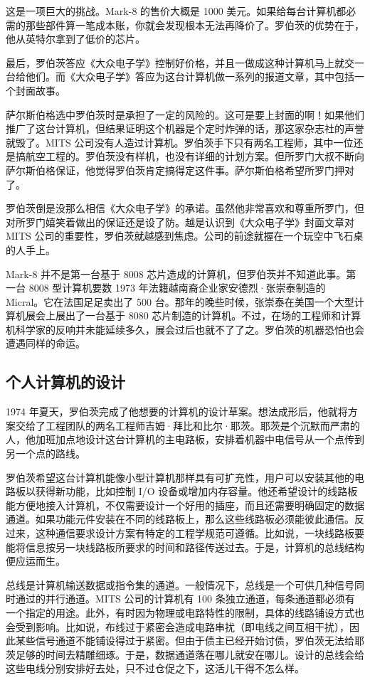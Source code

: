 \documentclass[12pt,UTF8]{ctexbook}
\begin{document}
这是一项巨大的挑战。Mark-8 的售价大概是 1000 美元。如果给每台计算机都必需的那些部件算一笔成本账，你就会发现根本无法再降价了。罗伯茨的优势在于，他从英特尔拿到了低价的芯片。

最后，罗伯茨答应《大众电子学》控制好价格，并且一做成这种计算机马上就交一台给他们。而《大众电子学》答应为这台计算机做一系列的报道文章，其中包括一个封面故事。

萨尔斯伯格选中罗伯茨时是承担了一定的风险的。这可是要上封面的啊！如果他们推广了这台计算机，但结果证明这个机器是个定时炸弹的话，那这家杂志社的声誉就毁了。MITS 公司没有人造过计算机。罗伯茨手下只有两名工程师，其中一位还是搞航空工程的。罗伯茨没有样机，也没有详细的计划方案。但所罗门大叔不断向萨尔斯伯格保证，他觉得罗伯茨肯定搞得定这件事。萨尔斯伯格希望所罗门押对了。

罗伯茨倒是没那么相信《大众电子学》的承诺。虽然他非常喜欢和尊重所罗门，但对所罗门嬉笑着做出的保证还是设了防。越是认识到《大众电子学》封面文章对 MITS 公司的重要性，罗伯茨就越感到焦虑。公司的前途就握在一个玩空中飞石桌的人手上。

Mark-8 并不是第一台基于 8008 芯片造成的计算机，但罗伯茨并不知道此事。第一台 8008 型计算机要数 1973 年法籍越南裔企业家安德烈·张崇泰制造的 Micral。它在法国足足卖出了 500 台。那年的晚些时候，张崇泰在美国一个大型计算机展会上展出了一台基于 8080 芯片制造的计算机。不过，在场的工程师和计算机科学家的反响并未能延续多久，展会过后也就不了了之。罗伯茨的机器恐怕也会遭遇同样的命运。





\subsection{个人计算机的设计}


1974 年夏天，罗伯茨完成了他想要的计算机的设计草案。想法成形后，他就将方案交给了工程团队的两名工程师吉姆·拜比和比尔·耶茨。耶茨是个沉默而严肃的人，他加班加点地设计这台计算机的主电路板，安排着机器中电信号从一个点传到另一个点的路线。

罗伯茨希望这台计算机能像小型计算机那样具有可扩充性，用户可以安装其他的电路板以获得新功能，比如控制 I/O 设备或增加内存容量。他还希望设计的线路板能方便地接入计算机，不仅需要设计一个好用的插座，而且还需要明确固定的数据通道。如果功能元件安装在不同的线路板上，那么这些线路板必须能彼此通信。反过来，这种通信要求设计方案有特定的工程学规范可遵循。比如说，一块线路板要能将信息按另一块线路板所要求的时间和路径传送过去。于是，计算机的总线结构便应运而生。

总线是计算机输送数据或指令集的通道。一般情况下，总线是一个可供几种信号同时通过的并行通道。MITS 公司的计算机有 100 条独立通道，每条通道都必须有一个指定的用途。此外，有时因为物理或电路特性的限制，具体的线路铺设方式也会受到影响。比如说，布线过于紧密会造成电路串扰（即电线之间互相干扰），因此某些信号通道不能铺设得过于紧密。但由于债主已经开始讨债，罗伯茨无法给耶茨足够的时间去精雕细琢。于是，数据通道落在哪儿就安在哪儿。设计的总线会给这些电线分别安排好去处，只不过仓促之下，这活儿干得不怎么样。
\end{document}
